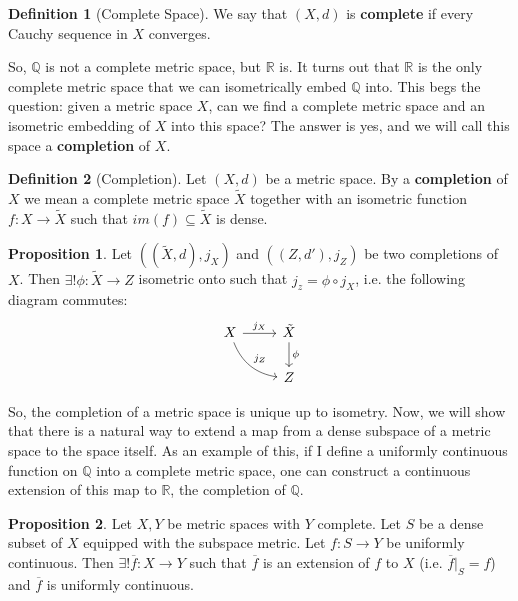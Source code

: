 \documentclass[11pt, oneside]{amsart}   	%
\theoremstyle{definition}
\newtheorem{definition}{Definition}[section]
\newtheorem{prop}{Proposition}[section]
\begin{document}
	\begin{definition}[Complete Space]
		We say that $(X, d)$ is \textbf{complete} if every Cauchy sequence in $X$ converges.
	\end{definition}
	
	So, $\mathbb Q$ is not a complete metric space, but $\mathbb R$ is. It turns out that $\mathbb R$ is the only complete metric space that we can isometrically 
	embed $\mathbb Q$ into. This begs the question: given a metric space $X$, can we find a complete metric space and an isometric embedding of $X$ into 
	this space? The answer is yes, and we will call this space a \textbf{completion} of $X$.
	
	\begin{definition}[Completion]
		Let $(X, d)$ be a metric space. By a \textbf{completion} of $X$ we mean a complete metric space $\tilde X$ together with an isometric function $f : X
		\rightarrow\tilde X$ such that $im(f)\subseteq\tilde X$ is dense.
	\end{definition}
	
	\begin{prop}
		Let $((\tilde X, d), j_X)$ and $(( Z, d'), j_Z)$ be two completions of $X$. Then $\exists !\phi : \tilde X\rightarrow Z$ isometric onto such that $j_z = 
		\phi\circ j_X$, i.e. the following diagram commutes:
		\[
		\begin{tikzcd}
			X \arrow[r, "j_X"] \arrow[rd, bend right, "j_Z"] & \tilde X \arrow[d, "\phi"] \\
			& Z
		\end{tikzcd}
		\]
	\end{prop}
	
	So, the completion of a metric space is unique up to isometry. Now, we will show that there is a natural way to extend a map from a dense subspace of a 
	metric space to the space itself. As an example of this, if I define a uniformly continuous function on $\mathbb Q$ into a complete metric space, one can 
	construct a continuous extension of this map to $\mathbb R$, the completion of $\mathbb Q$. 
	
	\begin{prop}
		Let $X, Y$ be metric spaces with $Y$ complete. Let $S$ be a dense subset of $X$ equipped with the subspace metric. Let $f : S\rightarrow Y$ be 
		uniformly continuous. Then $\exists ! \overline f : X\rightarrow Y$ such that $\overline f$ is an extension of $f$ to $X$ (i.e. $\overline f|_S = f$) and 
		$\overline f$ is uniformly continuous.
	\end{prop}
	
\end{document}
